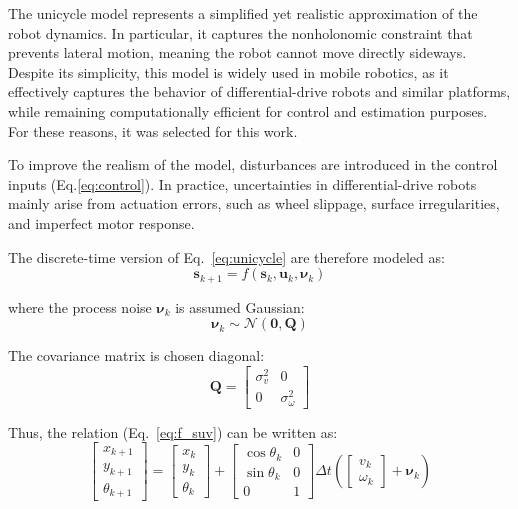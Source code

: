 \documentclass[times, twoside]{zHenriquesLab-StyleBioRxiv}
\begin{document}
The unicycle model represents a simplified yet realistic approximation of the robot dynamics. In particular, it captures the nonholonomic constraint that prevents lateral motion, meaning the robot cannot move directly sideways. Despite its simplicity, this model is widely used in mobile robotics, as it effectively captures the behavior of differential-drive robots and similar platforms, while remaining computationally efficient for control and estimation purposes. For these reasons, it was selected for this work.


To improve the realism of the model, disturbances are introduced in the control inputs (Eq.\ref{eq:control}). In practice, uncertainties in differential-drive robots mainly arise from actuation errors, such as wheel slippage, surface irregularities, and imperfect motor response.

The discrete-time version of Eq.~\ref{eq:unicycle} are therefore modeled as:
\begin{equation}
    \mathbf{s}_{k+1} = f(\mathbf{s}_k, \mathbf{u}_k, \boldsymbol{\nu}_k)
\label{eq:f_suv}
\end{equation}

where the process noise $\boldsymbol{\nu}_k$ is assumed Gaussian:
\begin{equation}
    \boldsymbol{\nu}_k \sim \mathcal{N}(\mathbf{0}, \mathbf{Q})
    \label{eq:process_noise}
\end{equation}

The covariance matrix is chosen diagonal:
\begin{equation}
    \mathbf{Q} =
    \begin{bmatrix}
        \sigma_v^2 & 0 \\
        0 & \sigma_\omega^2
    \end{bmatrix}
\end{equation}

Thus, the relation (Eq.~\ref{eq:f_suv}) can be written as:
\begin{equation}
\label{eq:discr_unicycle}
\begin{bmatrix}
    x_{k+1} \\
    y_{k+1} \\
    \theta_{k+1}
\end{bmatrix}
=
\begin{bmatrix}
    x_k \\
    y_k \\
    \theta_k
\end{bmatrix}
+
\begin{bmatrix}
    \cos\theta_k & 0 \\
    \sin\theta_k & 0 \\
    0 & 1
\end{bmatrix}
\Delta t
\left(
\begin{bmatrix}
    v_k \\
    \omega_k
\end{bmatrix}
+
\boldsymbol{\nu}_k
\right)
\end{equation}
\end{document}
